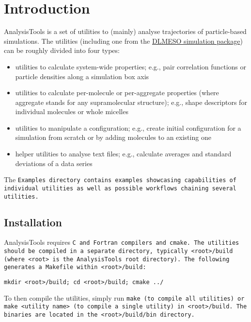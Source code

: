 \chapter{Introduction}

AnalysisTools is a set of utilities to (mainly) analyse trajectories of
particle-based simulations. The utilities (including one
from the \href{https://www.scd.stfc.ac.uk/Pages/DL_MESO.aspx}{DLMESO
simulation package}) can be roughly divided into four types:

\begin{itemize}
  \item utilities to calculate system-wide properties; e.g., pair
    correlation functions or particle densities along a simulation box axis
  \item utilities to calculate per-molecule or per-aggregate properties
    (where aggregate stands for any supramolecular structure); e.g., shape
    descriptors for individual molecules or whole micelles
  \item utilities to manipulate a configuration; e.g., create initial
    configuration for a simulation from scratch or by adding molecules to
    an existing one
  \item helper utilities to analyse text files; e.g., calculate averages
    and standard deviations of a data series
\end{itemize}

The \tt{Examples} directory contains examples showcasing capabilities of
individual utilities as well as possible workflows chaining several utilities.

\section{Installation}

AnalysisTools requires \tt{C} and \tt{Fortran} compilers and \tt{cmake}. The
utilities should be compiled in a separate directory, typically
\tt{<root>/build} (where \tt{<root>} is the AnalysisTools root directory). The
following generates a \tt{Makefile} within \tt{<root>/build}:

\tt{mkdir <root>/build; cd <root>/build; cmake ../}

To then compile the utilities, simply run \tt{make} (to compile all utilities)
or \tt{make <utility name>} (to compile a single utility) in \tt{<root>/build}.
The binaries are located in the \tt{<root>/build/bin} directory.
